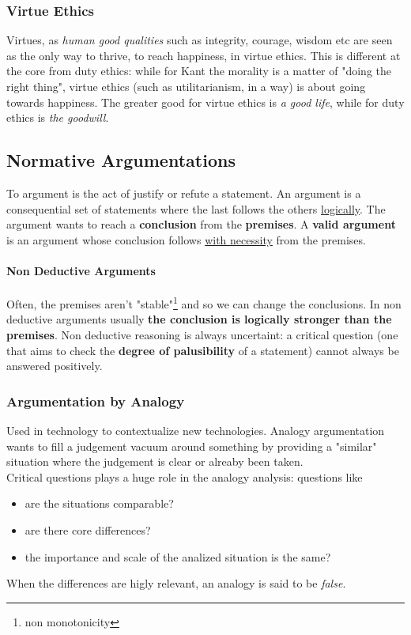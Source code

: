 \documentclass{article}
\begin{document}
			\subsubsection{Virtue Ethics}
				Virtues, as \textit{human good qualities} such as integrity, courage, wisdom etc are seen as the only way to thrive, to reach happiness, in virtue ethics. This is different at the core from duty ethics: while for Kant the morality is a matter of "doing the right thing", virtue ethics (such as utilitarianism, in a way) is about going towards happiness. The greater good for virtue ethics is \textit{a good life}, while for duty ethics is \textit{the goodwill}.
		
		\subsection{Normative Argumentations}
			To argument is the act of justify or refute a statement. An argument is a consequential set of statements where the last follows the others \underline{logically}. The argument wants to reach a \textbf{conclusion} from the \textbf{premises}. A \textbf{valid argument} is an argument whose conclusion follows \underline{with necessity} from the premises.

			\paragraph{Non Deductive Arguments}
				Often, the premises aren't "stable"\footnote{non monotonicity} and so we can change the conclusions. In non deductive arguments usually \textbf{the conclusion is logically stronger than the premises}. Non deductive reasoning is always uncertaint: a critical question (one that aims to check the \textbf{degree of palusibility} of a statement) cannot always be answered positively.

			\subsubsection{Argumentation by Analogy}
				Used in technology to contextualize new technologies. Analogy argumentation wants to fill a judgement vacuum around something by providing a "similar" situation where the judgement is clear or alreaby been taken.\\
				Critical questions plays a huge role in the analogy analysis: questions like
				\begin{itemize}
					\item are the situations comparable?
					\item are there core differences?
					\item the importance and scale of the analized situation is the same?
				\end{itemize}
				When the differences are higly relevant, an analogy is said to be \textit{false}.
\end{document}
